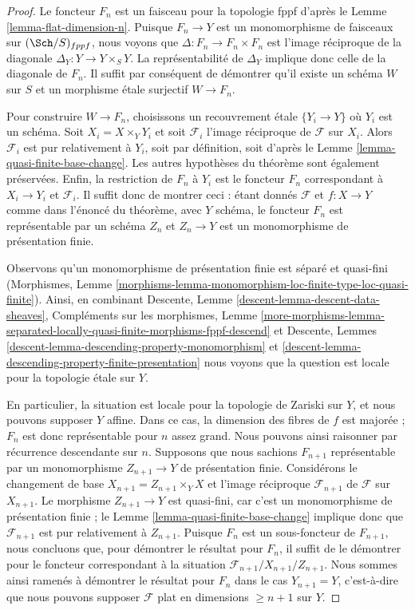 \begin{proof}
Le foncteur $F_n$ est un faisceau pour la topologie fppf d'après le
Lemme \ref{lemma-flat-dimension-n}.
Puisque $F_n \to Y$ est un monomorphisme de faisceaux sur
$(\Sch/S)_{fppf}$, nous voyons que $\Delta : F_n \to F_n \times F_n$
est l'image réciproque de la diagonale $\Delta_Y : Y \to Y \times_S Y$.
La représentabilité de $\Delta_Y$ implique donc celle
de la diagonale de $F_n$. Il suffit par conséquent de démontrer
qu'il existe un schéma $W$ sur $S$ et un morphisme \'etale surjectif
$W \to F_n$.

\medskip\noindent
Pour construire $W \to F_n$, choisissons un recouvrement \'etale $\{Y_i \to Y\}$
où $Y_i$ est un schéma. Soit $X_i = X \times_Y Y_i$ et soit
$\mathcal{F}_i$ l'image réciproque de $\mathcal{F}$ sur $X_i$.
Alors $\mathcal{F}_i$ est pur relativement à $Y_i$, soit par définition,
soit d'après le Lemme \ref{lemma-quasi-finite-base-change}.
Les autres hypothèses du théorème sont également préservées.
Enfin, la restriction de $F_n$ à $Y_i$ est
le foncteur $F_n$ correspondant à $X_i \to Y_i$ et $\mathcal{F}_i$.
Il suffit donc de montrer ceci : étant donnés $\mathcal{F}$ et $f : X \to Y$
comme dans l'énoncé du théorème, avec $Y$ schéma, le
foncteur $F_n$ est représentable par un schéma $Z_n$ et
$Z_n \to Y$ est un monomorphisme de présentation finie.

\medskip\noindent
Observons qu'un monomorphisme de présentation finie est
séparé et quasi-fini (Morphismes, Lemme
\ref{morphisms-lemma-monomorphism-loc-finite-type-loc-quasi-finite}).
Ainsi, en combinant
Descente, Lemme \ref{descent-lemma-descent-data-sheaves},
Compléments sur les morphismes, Lemme
\ref{more-morphisms-lemma-separated-locally-quasi-finite-morphisms-fppf-descend}
et
Descente, Lemmes \ref{descent-lemma-descending-property-monomorphism} et
\ref{descent-lemma-descending-property-finite-presentation}
nous voyons que la question est locale pour la topologie \'etale sur $Y$.

\medskip\noindent
En particulier, la situation est locale pour la topologie de Zariski sur $Y$,
et nous pouvons supposer $Y$ affine. Dans ce cas, la dimension des
fibres de $f$ est majorée ; $F_n$ est donc représentable
pour $n$ assez grand. Nous pouvons ainsi raisonner par récurrence descendante sur $n$.
Supposons que nous sachions $F_{n + 1}$ représentable par un monomorphisme
$Z_{n + 1} \to Y$ de présentation finie. Considérons le changement de base
$X_{n + 1} = Z_{n + 1} \times_Y X$ et l'image réciproque $\mathcal{F}_{n + 1}$
de $\mathcal{F}$ sur $X_{n + 1}$. Le morphisme $Z_{n + 1} \to Y$ est
quasi-fini, car c'est un monomorphisme de présentation finie ; le
Lemme \ref{lemma-quasi-finite-base-change}
implique donc que $\mathcal{F}_{n + 1}$ est pur relativement à $Z_{n + 1}$.
Puisque $F_n$ est un sous-foncteur de $F_{n + 1}$, nous concluons que, pour
démontrer le résultat pour $F_n$, il suffit de le démontrer pour le
foncteur correspondant à la situation
$\mathcal{F}_{n + 1}/X_{n + 1}/Z_{n + 1}$.
Nous sommes ainsi ramenés à démontrer le résultat pour $F_n$ dans le cas
$Y_{n + 1} = Y$, c'est-à-dire que nous pouvons supposer $\mathcal{F}$ plat
en dimensions $\geq n + 1$ sur $Y$.


\end{proof}
